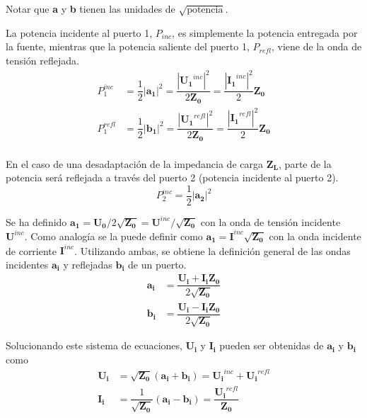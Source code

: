 Notar que \textbf{a} y \textbf{b} tienen las unidades de $\sqrt{\textrm{potencia}}$.

La potencia incidente al puerto 1, $P_{inc}$, es simplemente la potencia entregada por la fuente, mientras que la potencia saliente del puerto 1, $P_{refl}$, viene de la onda de tensión reflejada.
\begin{equation}
\begin{aligned}
  P_1^{inc} &= \dfrac{1}{2}|\bm{a_1}|^2= \dfrac{|\bm{U_1}^{inc}|^2}{2\bm{Z_0}}=\dfrac{|\bm{I_1}^{inc}|^2}{2}\bm{Z_0} \\
  P_1^{refl} &= \dfrac{1}{2}|\bm{b_1}|^2= \dfrac{|\bm{U_1}^{refl}|^2}{2\bm{Z_0}}=\dfrac{|\bm{I_1}^{refl}|^2}{2}\bm{Z_0} \\
\end{aligned}
\end{equation}

En el caso de una desadaptación de la impedancia de carga $\bm{Z_L}$, parte de la potencia será reflejada a través del puerto 2 (potencia incidente al puerto 2).
\begin{equation}
P_2^{inc}=\dfrac{1}{2}|\bm{a_2}|^2
\end{equation}

Se ha definido $\bm{a_1} = \bm{U_0}/2\sqrt{\bm{Z_0}} = \bm{U}^{inc}/\sqrt{\bm{Z_0}}$ con la onda de tensión incidente $\bm{U}^{inc}$. Como analogía se la puede definir como $\bm{a_1} = \bm{I}^{inc}\sqrt{\bm{Z_0}}$ con la onda incidente de corriente $\bm{I}^{inc}$. Utilizando ambas, se obtiene la definición general de las ondas incidentes $\bm{a_i}$ y reflejadas $\bm{b_i}$ de un puerto.
\begin{equation}
\begin{aligned}
  \bm{a_i} &= \dfrac{\bm{U_i} + \bm{I_i}\bm{Z_0}}{2\sqrt{\bm{Z_0}}} \\
  \bm{b_i} &= \dfrac{\bm{U_i} - \bm{I_i}\bm{Z_0}}{2\sqrt{\bm{Z_0}}}
\end{aligned}
\label{eq:waves}
\end{equation}

Solucionando este sistema de ecuaciones, $\bm{U_i}$ y $\bm{I_i}$ pueden ser obtenidas de $\bm{a_i}$ y $\bm{b_i}$ como
\begin{equation}
\begin{aligned}
  \bm{U_i} &= \sqrt{\bm{Z_0}}(\bm{a_i} + \bm{b_i}) = \bm{U_i}^{inc} + \bm{U_i}^{refl}\\
  \bm{I_i} &= \dfrac{1}{\sqrt{\bm{Z_0}}}(\bm{a_i} - \bm{b_i}) = \dfrac{\bm{U_i}^{refl}}{\bm{Z_0}}
\end{aligned}
\end{equation}


